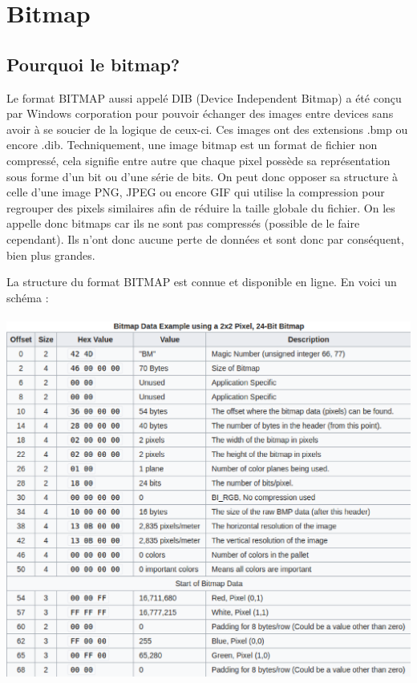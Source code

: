 \section {Bitmap}

\subsection {Pourquoi le bitmap?}
Le format BITMAP aussi appelé DIB (Device Independent Bitmap) a été conçu par Windows corporation pour pouvoir échanger des images entre devices sans avoir à se soucier de la logique de ceux-ci.
Ces images ont des extensions .bmp ou encore .dib.
Techniquement, une image bitmap est un format de fichier non compressé, cela signifie entre autre que chaque pixel possède sa représentation sous forme d'un bit ou d'une série de bits.
On peut donc opposer sa structure à celle d'une image PNG, JPEG ou encore GIF qui utilise la compression pour regrouper des pixels similaires afin de réduire la taille globale du fichier.
On les appelle donc bitmaps car ils ne sont pas compressés (possible de le faire cependant).
Ils n'ont donc aucune perte de données et sont donc par conséquent, bien plus grandes.

La structure du format BITMAP est connue et disponible en ligne. En voici un schéma : \\\\

\includegraphics{bitmap_structure.eps}

